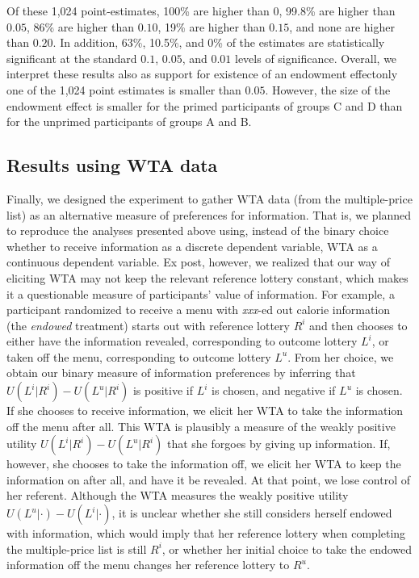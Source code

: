 \documentclass[12pt]{article}
\begin{document}
Of these 1,024 point-estimates, 100\% are higher than $0$, 99.8\% are higher than $0.05$, 86\% are higher than $0.10$, 19\% are higher than $0.15$, and none are higher than $0.20$. In addition, 63\%, 10.5\%, and 0\% of the estimates are statistically significant at the standard $0.1$, $0.05$, and $0.01$ levels of significance. Overall, we interpret these results also as support for existence of an endowment effect\textemdash only one of the 1,024 point estimates is smaller than $0.05$. However, the size of the endowment effect is smaller for the primed participants of groups C and D than for the unprimed participants of groups A and B.

\subsection{Results using WTA data}

Finally, we designed the experiment to gather WTA data (from the multiple-price list) as an alternative measure of preferences for information. That is, we planned to reproduce the analyses presented above using, instead of the binary choice whether to receive information as a discrete dependent variable, WTA as a continuous dependent variable. Ex post, however, we realized that our way of eliciting WTA may not keep the relevant reference lottery constant, which makes it a questionable measure of participants’ value of information. For example, a participant randomized to receive a menu with \emph{xxx}-ed out calorie information (the \emph{endowed} treatment) starts out with reference lottery $R^i$ and then chooses to either have the information revealed, corresponding to outcome lottery $L^i$, or taken off the menu, corresponding to outcome lottery $L^u$. From her choice, we obtain our binary measure of information preferences by inferring that $U(L^i|R^i)-U(L^u|R^i)$ is positive if $L^i$ is chosen, and negative if $L^u$ is chosen. If she chooses to receive information, we elicit her WTA to take the information off the menu after all. This WTA is plausibly a measure of the weakly positive utility $U(L^i|R^i)-U(L^u|R^i)$ that she forgoes by giving up information. If, however, she chooses to take the information off, we elicit her WTA to keep the information on after all, and have it be revealed. At that point, we lose control of her referent. Although the WTA measures the weakly positive utility $U(L^u|\cdot)-U(L^i|\cdot)$, it is unclear whether she still considers herself endowed with information, which would imply that her reference lottery when completing the multiple-price list is still $R^i$, or whether her initial choice to take the endowed information off the menu changes her reference lottery to $R^u$.
\end{document}
